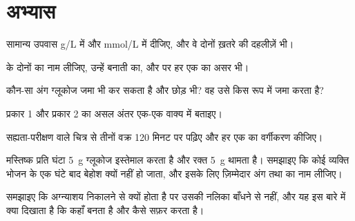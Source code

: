 \section{अभ्यास}

\begin{exercise}[$\star$]\label{exo:g12:glucose-and-diabetes:1}
सामान्य उपवास  \unit{g/L} में और \unit{mmol/L} में दीजिए, और वे
दोनों ख़तरे की दहलीज़ें भी।
\end{exercise}

\begin{exercise}[$\star$]\label{exo:g12:glucose-and-diabetes:2}
 के दोनों  का नाम लीजिए, उन्हें बनाती  का, और
 पर हर एक का असर भी।
\end{exercise}

\begin{exercise}[$\star$]\label{exo:g12:glucose-and-diabetes:3}
कौन-सा अंग ग्लूकोज जमा भी कर सकता है और छोड़ भी? वह उसे किस रूप में जमा करता
है?
\end{exercise}

\begin{exercise}[$\star$]\label{exo:g12:glucose-and-diabetes:4}
प्रकार 1 और प्रकार 2  का असल अंतर एक-एक वाक्य में बताइए।
\end{exercise}

\begin{exercise}[$\star$]\label{exo:g12:glucose-and-diabetes:5}
सह्यता-परीक्षण वाले चित्र से तीनों वक्र 120 मिनट पर पढ़िए और हर एक का
वर्गीकरण कीजिए।
\end{exercise}

\begin{exercise}[$\star\star$]\label{exo:g12:glucose-and-diabetes:6}
मस्तिष्क प्रति घंटा \qty{5}{g} ग्लूकोज इस्तेमाल करता है और रक्त \qty{5}{g}
थामता है। समझाइए कि कोई व्यक्ति भोजन के एक घंटे बाद बेहोश क्यों नहीं हो
जाता, और इसके लिए ज़िम्मेदार अंग तथा  का नाम लीजिए।
\end{exercise}

\begin{exercise}[$\star\star$]\label{exo:g12:glucose-and-diabetes:7}
समझाइए कि अग्न्याशय निकालने से  क्यों होता है पर उसकी नलिका बाँधने से
नहीं, और यह इस बारे में क्या दिखाता है कि  कहाँ बनता है और कैसे
सफ़र करता है।
\end{exercise}

